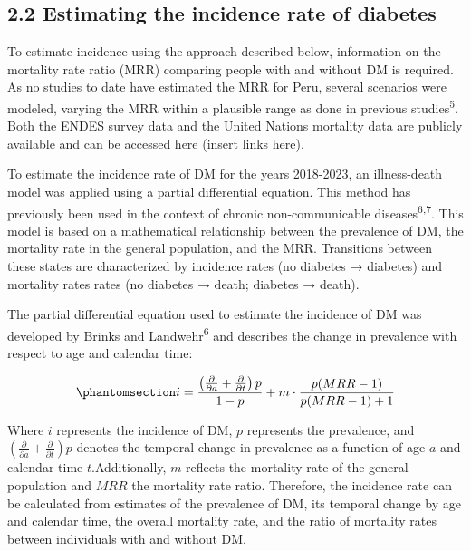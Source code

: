 \documentclass[
  letterpaper,
  DIV=11,
  numbers=noendperiod]{scrartcl}
\begin{document}
\subsection{2.2 Estimating the incidence rate of
diabetes}\label{estimating-the-incidence-rate-of-diabetes}

To estimate incidence using the approach described below, information on
the mortality rate ratio (MRR) comparing people with and without DM is
required. As no studies to date have estimated the MRR for Peru, several
scenarios were modeled, varying the MRR within a plausible range as done
in previous studies\textsuperscript{5}. Both the ENDES survey data and
the United Nations mortality data are publicly available and can be
accessed here (insert links here).

To estimate the incidence rate of DM for the years 2018-2023, an
illness-death model was applied using a partial differential equation.
This method has previously been used in the context of chronic
non-communicable diseases\textsuperscript{6,7}. This model is based on a
mathematical relationship between the prevalence of DM, the mortality
rate in the general population, and the MRR. Transitions between these
states are characterized by incidence rates (no diabetes → diabetes) and
mortality rates rates (no diabetes → death; diabetes → death).

The partial differential equation used to estimate the incidence of DM
was developed by Brinks and Landwehr\textsuperscript{6} and describes
the change in prevalence with respect to age and calendar time:

\begin{equation}\phantomsection\label{eq-PDE}{
i = \frac{\left( \frac{\partial}{\partial a} + \frac{\partial}{\partial t} \right)p}{1 - p} + m \cdot \frac{p (MRR - 1)}{p (MRR - 1) + 1}
}\end{equation}

Where \(i\) represents the incidence of DM, \(p\) represents the
prevalence, and
\(\left( \frac{\partial}{\partial a} + \frac{\partial}{\partial t} \right)p\)
denotes the temporal change in prevalence as a function of age \(a\) and
calendar time \(t\).Additionally, \(m\) reflects the mortality rate of
the general population and \(MRR\) the mortality rate ratio. Therefore,
the incidence rate can be calculated from estimates of the prevalence of
DM, its temporal change by age and calendar time, the overall mortality
rate, and the ratio of mortality rates between individuals with and
without DM.
\end{document}
